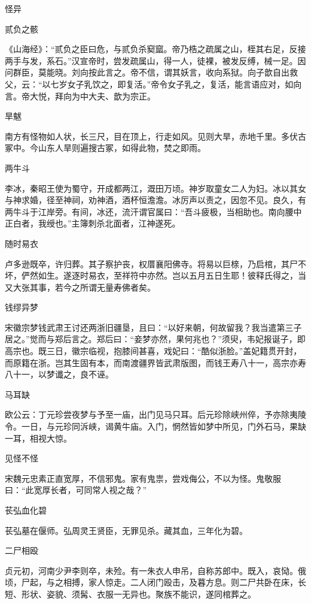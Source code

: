 \documentclass[a4paper,12pt,UTF8,twoside]{ctexbook}
\begin{document}
    怪异 
    
    贰负之骸
    
    《山海经》：“贰负之臣曰危，与贰负杀窫窳。帝乃梏之疏属之山，桎其右足，反接两手与发，系石。”汉宣帝时，尝发疏属山，得一人，徒裸，被发反缚，械一足。因问群臣，莫能晓。刘向按此言之。帝不信，谓其妖言，收向系狱。向子歆自出救父，云：“以七岁女子乳饮之，即复活。”帝令女子乳之，复活，能言语应对，如向言。帝大悦，拜向为中大夫、歆为宗正。
    
    旱魃
    
    南方有怪物如人状，长三尺，目在顶上，行走如风。见则大旱，赤地千里。多伏古冢中。今山东人旱则遍搜古冢，如得此物，焚之即雨。
    
    两牛斗
    
    李冰，秦昭王使为蜀守，开成都两江，溉田万顷。神岁取童女二人为妇。冰以其女与神求婚，径至神祠，劝神酒，酒杯恒澹澹。冰厉声以责之，因忽不见。良久，有两牛斗于江岸旁。有间，冰还，流汗谓官属曰：“吾斗疲极，当相助也。南向腰中正白者，我绶也。”主簿刺杀北面者，江神遂死。
    
    随时易衣
    
    卢多逊既卒，许归葬。其子察护丧，权厝襄阳佛寺。将易以巨榇，乃启棺，其尸不坏，俨然如生。遂逐时易衣，至祥符中亦然。岂以五月五日生耶！彼释氏得之，当又大张其事，若今之所谓无量寿佛者矣。
    
    钱缪异梦
    
    宋徽宗梦钱武肃王讨还两浙旧疆垦，且曰：“以好来朝，何故留我？我当遣第三子居之。”觉而与郑后言之。郑后曰：“妾梦亦然，果何兆也？”须臾，韦妃报诞子，即高宗也。既三日，徽宗临视，抱膝间甚喜，戏妃曰：“酷似浙脸。”盖妃籍贯开封，而原籍在浙。岂其生固有本，而南渡疆界皆武肃版图，而钱王寿八十一，高宗亦寿八十一，以梦谶之，良不诬。
    
    马耳缺
    
    欧公云：丁元珍尝夜梦与予至一庙，出门见马只耳。后元珍除峡州倅，予亦除夷陵令。一日，与元珍同泝峡，谒黄牛庙。入门，惘然皆如梦中所见，门外石马，果缺一耳，相视大惊。
    
    见怪不怪
    
    宋魏元忠素正直宽厚，不信邪鬼。家有鬼祟，尝戏侮公，不以为怪。鬼敬服曰：“此宽厚长者，可同常人视之哉？”
    
    苌弘血化碧
    
    苌弘墓在偃师。弘周灵王贤臣，无罪见杀。藏其血，三年化为碧。
    
    二尸相殴
    
    贞元初，河南少尹李则卒，未殓。有一朱衣人申吊，自称苏郎中。既入，哀恸。俄顷，尸起，与之相搏，家人惊走。二人闭门殴击，及暮方息。则二尸共卧在床，长短、形状、姿貌、须髯、衣服一无异也。聚族不能识，遂同棺葬之。
    
\end{document}
